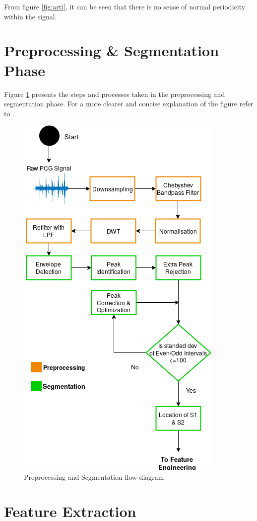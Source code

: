 \documentclass[10pt,twocolumn]{witseiepaper}
\begin{document}
From figure \ref{fig:arti}, it can be seen that there is no sense of normal periodicity within the signal.

\section{Preprocessing \& Segmentation Phase}
\label{app:preseg}
Figure \ref{fig:preseg} presents the steps and processes taken in the preprocessing and segmentation phase. For a more clearer and concise explanation of the figure refer to \cite{love}.
\begin{figure}[h!]
    \centering
    \includegraphics[scale=0.5]{./reportFDfinal.png}
    \caption{Preprocessing and Segmentation flow diagram}
    \label{fig:preseg}
\end{figure}{}

\section{Feature Extraction}
\label{app:features}
\end{document}
